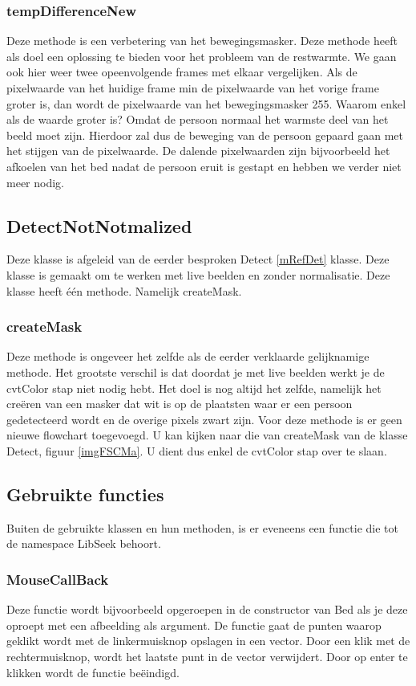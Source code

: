  \subsubsection{tempDifferenceNew}
Deze methode is een verbetering van het bewegingsmasker. Deze methode heeft als doel een oplossing te bieden voor het probleem van de restwarmte. We gaan ook hier weer twee opeenvolgende frames met elkaar vergelijken. Als de pixelwaarde van het huidige frame min de pixelwaarde van het vorige frame groter is, dan wordt de pixelwaarde van het bewegingsmasker 255. Waarom enkel als de waarde groter is? Omdat de persoon normaal het warmste deel van het beeld moet zijn. Hierdoor zal dus de beweging van de persoon gepaard gaan met het stijgen van de pixelwaarde. De dalende pixelwaarden zijn bijvoorbeeld het afkoelen van het bed nadat de persoon eruit is gestapt en hebben we verder niet meer nodig.
 
 \subsection{DetectNotNotmalized}
 \label{mRefDNN}
Deze klasse is afgeleid van de eerder besproken Detect \ref{mRefDet} klasse. Deze klasse is gemaakt om te werken met live beelden en zonder normalisatie. Deze klasse heeft \'e\'en methode. Namelijk createMask.
 
 \subsubsection{createMask}
 Deze methode is ongeveer het zelfde als de eerder verklaarde gelijknamige methode. Het grootste verschil is dat doordat je met live beelden werkt je de cvtColor stap niet nodig hebt. Het doel is nog altijd het zelfde, namelijk het cre\"eren van een masker dat wit is op de plaatsten waar er een persoon gedetecteerd wordt en de overige pixels zwart zijn. Voor deze methode is er geen nieuwe flowchart toegevoegd. U kan kijken naar die van createMask van de klasse Detect, figuur \ref{imgFSCMa}. U dient dus enkel de cvtColor stap over te slaan. 
 
\subsection{Gebruikte functies}
\label{MRefGFu}
Buiten de gebruikte klassen en hun methoden, is er eveneens een functie die tot de namespace LibSeek behoort.

\subsubsection{MouseCallBack}
Deze functie wordt bijvoorbeeld opgeroepen in de constructor van Bed als je deze oproept met een afbeelding als argument. De functie gaat de punten waarop geklikt wordt met de linkermuisknop opslagen in een vector. Door een klik met de rechtermuisknop, wordt het laatste punt in de vector verwijdert. Door op enter te klikken wordt de functie be\"eindigd. 

